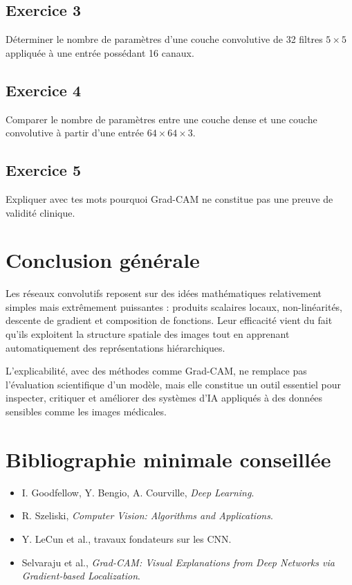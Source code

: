 \documentclass[11pt,a4paper]{article}
\begin{document}
\subsection*{Exercice 3}
Déterminer le nombre de paramètres d'une couche convolutive de 32 filtres $5\times5$ appliquée à une entrée possédant 16 canaux.

\subsection*{Exercice 4}
Comparer le nombre de paramètres entre une couche dense et une couche convolutive à partir d'une entrée $64 \times 64 \times 3$.

\subsection*{Exercice 5}
Expliquer avec tes mots pourquoi Grad-CAM ne constitue pas une preuve de validité clinique.

\section{Conclusion générale}

Les réseaux convolutifs reposent sur des idées mathématiques relativement simples mais extrêmement puissantes : produits scalaires locaux, non-linéarités, descente de gradient et composition de fonctions. Leur efficacité vient du fait qu'ils exploitent la structure spatiale des images tout en apprenant automatiquement des représentations hiérarchiques.

L'explicabilité, avec des méthodes comme Grad-CAM, ne remplace pas l'évaluation scientifique d'un modèle, mais elle constitue un outil essentiel pour inspecter, critiquer et améliorer des systèmes d'IA appliqués à des données sensibles comme les images médicales.

\appendix

\section{Bibliographie minimale conseillée}

\begin{itemize}
    \item I. Goodfellow, Y. Bengio, A. Courville, \emph{Deep Learning}.
    \item R. Szeliski, \emph{Computer Vision: Algorithms and Applications}.
    \item Y. LeCun et al., travaux fondateurs sur les CNN.
    \item Selvaraju et al., \emph{Grad-CAM: Visual Explanations from Deep Networks via Gradient-based Localization}.
\end{itemize}
\end{document}
